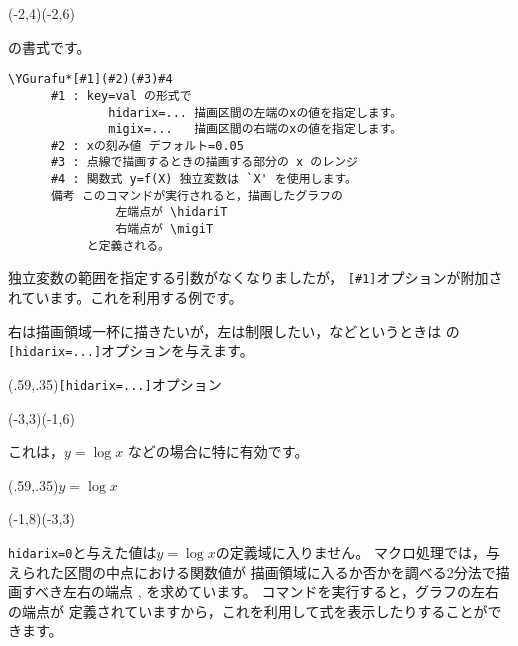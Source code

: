 \begin{showEx}{}
\small
\begin{zahyou}(-2,4)(-2,6)
\end{zahyou}
\end{showEx}

の書式です。

\begin{boxnote}
\begin{verbatim}
\YGurafu*[#1](#2)(#3)#4
      #1 : key=val の形式で
              hidarix=... 描画区間の左端のxの値を指定します。
              migix=...   描画区間の右端のxの値を指定します。
      #2 : xの刻み値 デフォルト=0.05
      #3 : 点線で描画するときの描画する部分の x のレンジ
      #4 : 関数式 y=f(X) 独立変数は `X' を使用します。
      備考 このコマンドが実行されると，描画したグラフの
               左端点が \hidariT
               右端点が \migiT
           と定義される。
\end{verbatim}
\end{boxnote}

独立変数の範囲を指定する引数がなくなりましたが，
\verb+[#1]+オプションが附加されています。これを利用する例です。

右は描画領域一杯に描きたいが，左は制限したい，などというときは
の\texttt{[hidarix=...]}オプションを与えます。

\begin{showEx}(.59,.35){\texttt{[hidarix=...]}オプション}
\begin{zahyou}[ul=5mm](-3,3)(-1,6)
\zahyouMemori[g]
\Put{}
\end{zahyou}
\end{showEx}

これは，$y=\log x$ などの場合に特に有効です。

\begin{showEx}(.59,.35){$y=\log x$}
\begin{zahyou}[ul=5mm](-1,8)(-3,3)
\zahyouMemori[g]
\Put{}
\end{zahyou}
\end{showEx}

\verb/hidarix=0/と与えた値は$y=\log x$の定義域に入りません。
マクロ処理では，与えられた区間の中点における関数値が
描画領域に入るか否かを調べる2分法で描画すべき左右の端点
, を求めています。
コマンドを実行すると，グラフの左右の端点が
定義されていますから，これを利用して式を表示したりすることができます。

